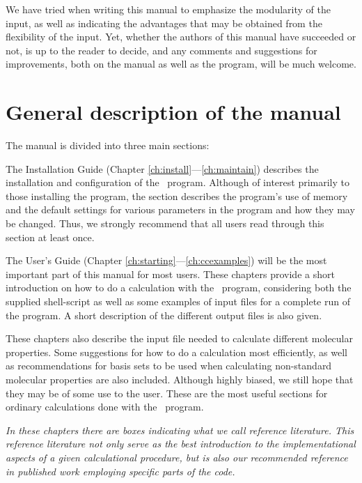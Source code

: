 We have tried when writing this manual to emphasize the modularity of
the input, as well as indicating  the advantages that may be obtained from
the flexibility of the input. Yet, whether the authors of
this manual have succeeded or not, is up to the reader to decide, and
any comments and suggestions for improvements, both on the manual as
well as the program, will be much welcome.

\section{General description of the manual}

The manual is divided into three main sections:

\begin{description}
\item The Installation Guide (Chapter
\ref{ch:install}---\ref{ch:maintain}) describes the
installation and configuration of the \dalton\ program. Although of
interest primarily to those installing the program, the section
describes the program's use of memory and the default settings for
various parameters in the program and how they may be changed. Thus,
we strongly recommend that all users read through this section at least
once.

\item The User's Guide (Chapter
\ref{ch:starting}---\ref{ch:ccexamples}) will be the most important
part of this manual for most users. These chapters provide a  short
introduction on how to do a calculation with the \dalton\ program,
considering both the supplied shell-script as well as some examples of
input files for a complete run of the program. A short description of
the different output files is also given.

These chapters also describe the input file needed to
calculate different molecular properties. Some
suggestions for how to do a calculation most efficiently, as well as
recommendations for basis sets to be used when calculating non-standard
molecular properties are also included. Although highly biased, we
still hope that they may be of some
use to the user. These are the most useful sections for
ordinary calculations done with the \dalton\ program.

{\em In these chapters there are boxes indicating what we call {\em
reference literature}. This reference
literature not only serve as
the best introduction to the implementational aspects of a given
calculational procedure, but is also our recommended reference in published
work employing specific parts of the code.}


\end{description}
